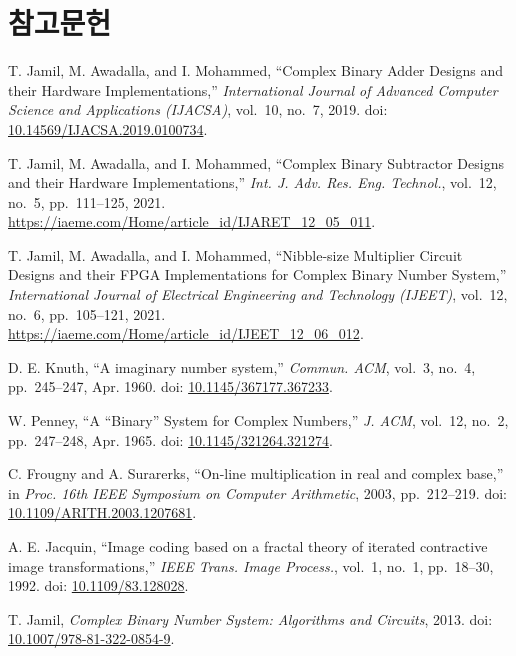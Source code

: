 \documentclass[10pt,a4paper,notitlepage]{report}
\begin{document}
\section{참고문헌}
\begin{thebibliography}{0}
T. Jamil, M. Awadalla, and I. Mohammed,
``Complex Binary Adder Designs and their Hardware Implementations,''
\textit{International Journal of Advanced Computer Science and Applications (IJACSA)},
vol.~10, no.~7, 2019.
doi: \href{https://doi.org/10.14569/IJACSA.2019.0100734}{10.14569/IJACSA.2019.0100734}.

T. Jamil, M. Awadalla, and I. Mohammed,
``Complex Binary Subtractor Designs and their Hardware Implementations,''
\textit{Int. J. Adv. Res. Eng. Technol.},
vol.~12, no.~5, pp.~111--125, 2021.
\url{https://iaeme.com/Home/article_id/IJARET_12_05_011}.

T. Jamil, M. Awadalla, and I. Mohammed,
``Nibble-size Multiplier Circuit Designs and their FPGA Implementations for Complex Binary Number System,''
\textit{International Journal of Electrical Engineering and Technology (IJEET)},
vol.~12, no.~6, pp.~105--121, 2021.
\url{https://iaeme.com/Home/article_id/IJEET_12_06_012}.

D. E. Knuth,
``A imaginary number system,''
\textit{Commun. ACM},
vol.~3, no.~4, pp.~245--247, Apr. 1960.
doi: \href{https://doi.org/10.1145/367177.367233}{10.1145/367177.367233}.

W. Penney,
``A ``Binary'' System for Complex Numbers,''
\textit{J. ACM},
vol.~12, no.~2, pp.~247--248, Apr. 1965.
doi: \href{https://doi.org/10.1145/321264.321274}{10.1145/321264.321274}.

C. Frougny and A. Surarerks,
``On-line multiplication in real and complex base,''
in \textit{Proc. 16th IEEE Symposium on Computer Arithmetic}, 2003, pp.~212--219.
doi: \href{https://doi.org/10.1109/ARITH.2003.1207681}{10.1109/ARITH.2003.1207681}.

A. E. Jacquin,
``Image coding based on a fractal theory of iterated contractive image transformations,''
\textit{IEEE Trans. Image Process.},
vol.~1, no.~1, pp.~18--30, 1992.
doi: \href{https://doi.org/10.1109/83.128028}{10.1109/83.128028}.

T. Jamil,
\textit{Complex Binary Number System: Algorithms and Circuits},
2013.
doi: \href{https://doi.org/10.1007/978-81-322-0854-9}{10.1007/978-81-322-0854-9}.


\end{thebibliography}
\end{document}

